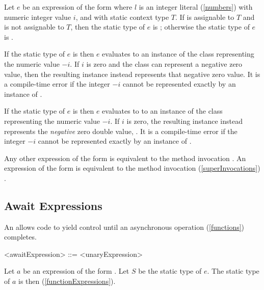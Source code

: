 \documentclass[makeidx]{article}
\begin{document}
{\LMHash{}%
Let $e$ be an expression of the form 
where $l$ is an integer literal (\ref{numbers}) with numeric integer value $i$,
and with static context type $T$.
If  is assignable to $T$ and  is not assignable to $T$,
then the static type of $e$ is ;
otherwise the static type of $e$ is .

\LMHash{}%
If the static type of $e$ is  then $e$ evaluates to
an instance of the  class representing the numeric value $-i$.
If $i$ is zero and the  class can represent a negative zero value,
then the resulting instance instead represents that negative zero value.
It is a compile-time error if the integer $-i$ cannot be represented
exactly by an instance of .

\LMHash{}%
If the static type of $e$ is  then $e$ evaluates to
to an instance of the  class representing the numeric value $-i$.
If $i$ is zero, the resulting instance instead represents the
\emph{negative} zero double value, .
It is a compile-time error if the integer $-i$ cannot be represented
exactly by an instance of .

\LMHash{}%
Any other expression of the form  is equivalent to
the method invocation .
An expression of the form  is equivalent to
the method invocation (\ref{superInvocations}) .


\subsection{Await Expressions}

\LMHash{}%
An  allows code to
yield control until an asynchronous operation
(\ref{functions})
completes.

\begin{grammar}
<awaitExpression> ::= \AWAIT{} <unaryExpression>
\end{grammar}

\LMHash{}%
%
Let $a$ be an expression of the form .
Let $S$ be the static type of $e$.
The static type of $a$ is then 
(\ref{functionExpressions}).

}
\end{document}

